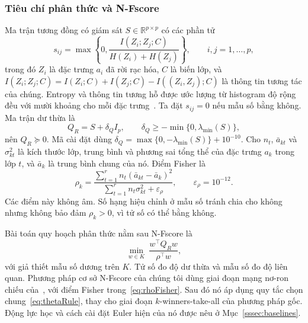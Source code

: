 \documentclass[]{interact}
\theoremstyle{plain}
\theoremstyle{definition}
\theoremstyle{remark}
\newcommand{\R}{\mathbb{R}}
\begin{document}
\subsubsection{Tiêu chí phân thức và N-Fscore}\label{ssec:wang}\label{sssec:wang-inputs}\label{sssec:nfscore}
Ma trận tương đồng có giám sát $S\in\R^{p\times p}$ có các phần tử
\begin{equation}\label{eq:simMI}
s_{ij}=\max\left\{0,\frac{I(Z_i;Z_j;C)}{H(Z_i)+H(Z_j)}\right\},\qquad i,j=1,\ldots,p,
\end{equation}
trong đó $Z_i$ là đặc trưng $a_i$ đã rời rạc hóa, $C$ là biến lớp, và $I(Z_i;Z_j;C)=I(Z_i;C)+I(Z_j;C)-I((Z_i,Z_j);C)$ là thông tin tương tác của chúng. Entropy và thông tin tương hỗ được ước lượng từ histogram độ rộng đều với mười khoảng cho mỗi đặc trưng~\citep{brown2012}. Ta đặt $s_{ij}=0$ nếu mẫu số bằng không. Ma trận dư thừa là
\begin{equation}\label{eq:matrixQ}
Q_R=S+\delta_QI_p,\qquad \delta_Q\ge-\min\{0,\lambda_{\min}(S)\},
\end{equation}
nên $Q_R\succeq0$. Mã cài đặt dùng $\delta_Q=\max\{0,-\lambda_{\min}(S)\}+10^{-10}$. Cho $n_t$, $\bar a_{kt}$ và $\sigma_{kt}^2$ là kích thước lớp, trung bình và phương sai tổng thể của đặc trưng $a_k$ trong lớp $t$, và $\bar a_k$ là trung bình chung của nó. Điểm Fisher là
\begin{equation}\label{eq:rhoFisher}
\rho_k=\frac{\sum_{t=1}^r n_t(\bar a_{kt}-\bar a_k)^2}{\sum_{t=1}^r n_t\sigma_{kt}^2+\varepsilon_\rho},\qquad \varepsilon_\rho=10^{-12}.
\end{equation}
Các điểm này không âm. Số hạng hiệu chỉnh ở mẫu số tránh chia cho không nhưng không bảo đảm $\rho_k>0$, vì tử số có thể bằng không.

Bài toán quy hoạch phân thức nằm sau N-Fscore là
\begin{equation}\label{eq:wangOrig}
\min_{w\in K}\ \frac{w^{\top}Q_Rw}{\rho^{\top}w},
\end{equation}
với giả thiết mẫu số dương trên $K$. Tử số đo độ dư thừa và mẫu số đo độ liên quan. Phương pháp cơ sở N-Fscore của chúng tôi dùng giai đoạn mạng nơ-ron chiếu của~\citep{wang2021fractional}, với điểm Fisher trong~\eqref{eq:rhoFisher}. Sau đó nó áp dụng quy tắc chọn chung~\eqref{eq:thetaRule}, thay cho giai đoạn $k$-winners-take-all của phương pháp gốc. Động lực học và cách cài đặt Euler hiện của nó được nêu ở Mục~\ref{sssec:baselines}.
\end{document}
